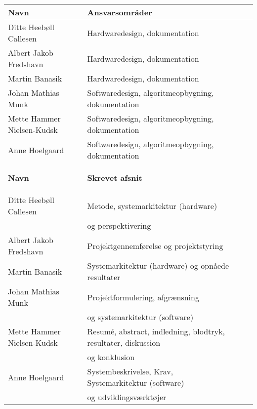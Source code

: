 \begin{longtabu} to 
    \textbf{Navn} &   \textbf{ Ansvarsområder} &    \\[-1ex]
    \midrule
    Ditte Heebøll Callesen &   Hardwaredesign, dokumentation	&    \\
    Albert Jakob Fredshavn &   Hardwaredesign, dokumentation	&    \\
    Martin Banasik         &   Hardwaredesign, dokumentation	&    \\
    Johan Mathias Munk     &   Softwaredesign, algoritmeopbygning, dokumentation &    \\
    Mette Hammer Nielsen-Kudsk &   Softwaredesign, algoritmeopbygning, dokumentation &    \\
   	Anne Hoelgaard    &   Softwaredesign, algoritmeopbygning, dokumentation	&    \\
\label{version_Systemark}

    \textbf{Navn} &    \textbf{Skrevet afsnit} &\\[-1ex]
    \midrule
    Ditte Heebøll Callesen & Metode, systemarkitektur (hardware) & \\
     & og perspektivering & \\
    Albert Jakob Fredshavn &  Projektgennemførelse og projektstyring & \\
    Martin Banasik         & Systemarkitektur (hardware) og opnåede resultater & \\
    Johan Mathias Munk     & Projektformulering, afgrænsning &  \\ & og systemarkitektur (software) & \\
    Mette Hammer Nielsen-Kudsk & Resumé, abstract, indledning, blodtryk, resultater, diskussion &  \\
     & og konklusion &  \\
   	Anne Hoelgaard   	 	& Systembeskrivelse, Krav, Systemarkitektur (software) & \\ & og udviklingsværktøjer & \\
\end{longtabu}

